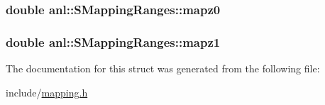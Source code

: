 \label{structanl_1_1SMappingRanges_a28f5e99e246bc97c76a22845d67ca0b7}
\hypertarget{structanl_1_1SMappingRanges_a33d5d0568c03b282f90c5b48088cb495}{
\subsubsection[{mapz0}]{\setlength{\rightskip}{0pt plus 5cm}double {\bf anl::SMappingRanges::mapz0}}}
\label{structanl_1_1SMappingRanges_a33d5d0568c03b282f90c5b48088cb495}
\hypertarget{structanl_1_1SMappingRanges_a4ebfededc81c8d269f90ccda66e7b876}{
\subsubsection[{mapz1}]{\setlength{\rightskip}{0pt plus 5cm}double {\bf anl::SMappingRanges::mapz1}}}
\label{structanl_1_1SMappingRanges_a4ebfededc81c8d269f90ccda66e7b876}


The documentation for this struct was generated from the following file:\begin{DoxyCompactItemize}
\item 
include/\hyperlink{mapping_8h}{mapping.h}\end{DoxyCompactItemize}
